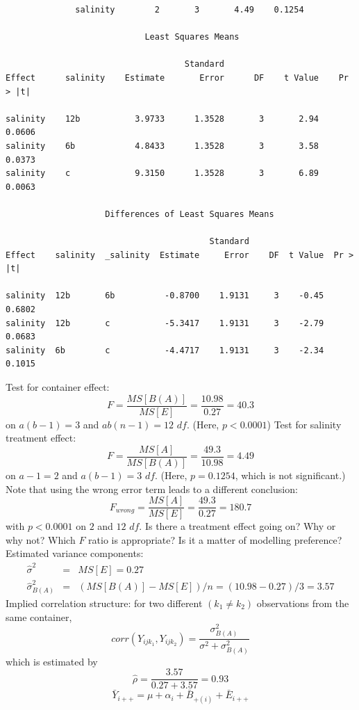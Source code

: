 \begin{large}
\begin{verbatim}
              salinity        2       3       4.49    0.1254

                            Least Squares Means
 
                                    Standard
Effect      salinity    Estimate       Error      DF    t Value    Pr > |t|

salinity    12b           3.9733      1.3528       3       2.94      0.0606
salinity    6b            4.8433      1.3528       3       3.58      0.0373
salinity    c             9.3150      1.3528       3       6.89      0.0063

                    Differences of Least Squares Means
 
                                         Standard
Effect    salinity  _salinity  Estimate     Error    DF  t Value  Pr > |t|

salinity  12b       6b          -0.8700    1.9131     3    -0.45    0.6802
salinity  12b       c           -5.3417    1.9131     3    -2.79    0.0683
salinity  6b        c           -4.4717    1.9131     3    -2.34    0.1015
\end{verbatim}
\end{large}
\newpage
Test for container effect:
$$ F = \frac{MS[B(A)]}{MS[E]} = \frac{10.98}{0.27} = 40.3 $$
on $a(b-1)=3$ and $ab(n-1)=12$ $df$.  (Here, $p < 0.0001$)
Test for salinity treatment effect:
$$ F = \frac{MS[A]}{MS[B(A)]} = \frac{49.3}{10.98} = 4.49 $$
on $a-1=2$ and $a(b-1)=3$ $df$.  (Here, $p = 0.1254$, which
is not significant.)
\bigkn
Note that using the wrong error term leads to a different
conclusion:
$$ F_{wrong} = \frac{MS[A]}{MS[E]} = \frac{49.3}{0.27} = 180.7 $$
with $p<0.0001$ on $2$ and $12$ $df.$
\bigkn
Is there a treatment effect going on?
Why or why not?  Which $F$ ratio is appropriate?  Is it a matter
of modelling preference?
\bigkn
\bigkn
Estimated variance components: 
\begin{eqnarray*}
\hat\sigma^2 &=&  MS[E] = 0.27\\
\hat\sigma_{B(A)}^2 &=&  (MS[B(A)]-MS[E])/n = (10.98-0.27)/3 =3.57
\end{eqnarray*}
Implied correlation structure:  for two different $(k_1 \neq k_2)$
observations from the same container, 
$$ corr(Y_{ijk_1},Y_{ijk_2}) = \frac{\sigma_{B(A)}^2}{\sigma^2+\sigma_{B(A)}^2} $$
which is estimated by
$$\hat\rho = \frac{3.57}{0.27+3.57} = 0.93$$
\newpage
{} 
$$ \bar{Y}_{i++} = \mu + \alpha_i + \bar{B}_{+(i)} + \bar{E}_{i++}$$
